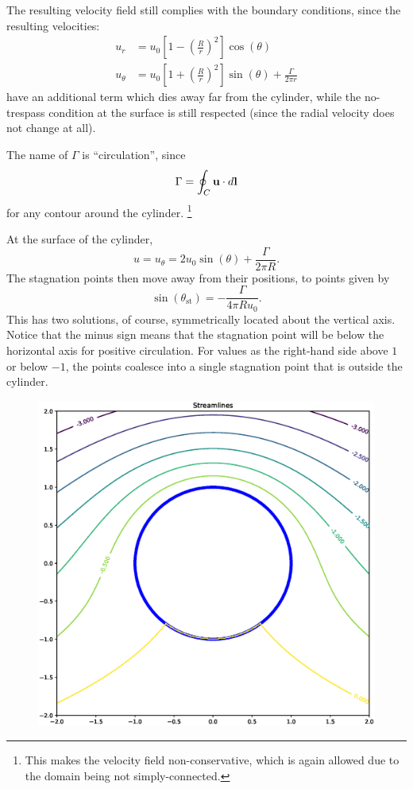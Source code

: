 The resulting velocity field still complies with the boundary
conditions, since the resulting velocities:
\begin{align}
u_r     &=   u_0  \left[ 1 - \left( \frac{R}{r}\right)^2 \right] \cos(\theta) \\
\label{eq:u_theta_cyl_pot_circ}
u_\theta &=   u_0  \left[ 1 + \left( \frac{R}{r}\right)^2 \right] \sin(\theta) +\frac{\Gamma}{2\pi r} 
\end{align}
have an additional term which dies away far from the cylinder, while
the no-trespass condition at the surface is still respected (since the
radial velocity does not change at all).

The name of $\Gamma$ is ``circulation'', since
\[
\Gamma = \oint_C \mathbf{u}\cdot d\mathbf{l}
\]
for any contour around the cylinder.%
\footnote{This makes the velocity
  field non-conservative, which is again allowed due to the domain
  being not simply-connected.}

At the surface of the cylinder,
\begin{equation}\label{eq:u_surface_cyl_pot_circ}
	u= u_\theta =  2 u_0  \sin(\theta) +\frac{\Gamma}{2\pi R} .
\end{equation}
The stagnation points then move away from their positions, to points given by
\begin{equation}\label{eq:u_stag_cyl_pot_circ}
	\sin(\theta_\mathrm{st})  = -\frac{\Gamma}{4\pi R u_0} .
\end{equation}
This has two solutions, of course, symmetrically located about the vertical axis.
Notice that the minus sign means that the
stagnation point will be below the horizontal axis for positive
circulation. For values as the right-hand side above $1$ or below $-1$,
the points coalesce into a single stagnation point that is outside the cylinder.

\begin{figure}
  \centering
  \includegraphics[width=0.4\linewidth]{figures/potential_flow_past_cylinder_rotating}
  \caption{\label{fig:potential_flow_past_cylinder_rotating}}
\end{figure}


